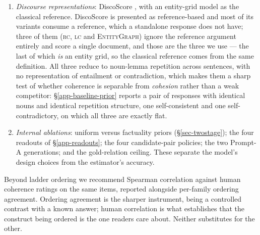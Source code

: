 \begin{enumerate}[leftmargin=1.6em,itemsep=2pt,topsep=3pt]
  no-rubric control. These are the practical incumbent and the comparison reviewers will want. The
  ladder is a demanding test for them, since consecutive rungs differ by a few words, so a judge must
  be sensitive at very small edit distances while remaining flat where meaning is preserved. We report
  each judge as a mean over five runs with its standard deviation, because the determinism of
  Rem.~\ref{rem-order} is only an advantage next to a measurement of the judge's instability, and
  because a spread wider than the gap being discussed bounds what the comparison can conclude ---
  though \S\ref{app-baseline-judges} reports that how much it bounds depends sharply on the backend.
\item \emph{Discourse representations}: DiscoScore \citep{discoscore}, with an entity-grid model
  \citep{barzilay} as the classical reference. DiscoScore is presented as reference-based and most of
  its variants consume a reference, which a standalone response does not have; three of them
  (\textsc{rc}, \textsc{lc} and \textsc{EntityGraph}) ignore the reference argument entirely and score
  a single document, and those are the three we use --- the last of which \emph{is} an entity grid,
  so the classical reference comes from the same definition. All three reduce to noun-lemma
  repetition across sentences, with no representation of entailment or contradiction, which makes
  them a sharp test of whether coherence is separable from \emph{cohesion} rather than a weak
  competitor: \S\ref{app-baseline-prior} reports a pair of responses with identical nouns and
  identical repetition structure, one self-consistent and one self-contradictory, on which all three
  are exactly flat.
\item \emph{Internal ablations}: uniform versus factuality priors (\S\ref{sec-twostage}); the four
  readouts of \S\ref{app-readouts}; the four candidate-pair policies; the two Prompt-A generations;
  and the gold-relation ceiling. These separate the model's design choices from the estimator's
  accuracy.
\end{enumerate}

Beyond ladder ordering we recommend Spearman correlation against human coherence ratings on the same
items, reported alongside per-family ordering agreement. Ordering agreement is the sharper instrument,
being a controlled contrast with a known answer; human correlation is what establishes that the
construct being ordered is the one readers care about. Neither substitutes for the other.

